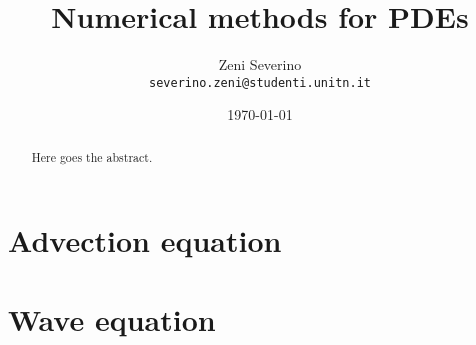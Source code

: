\documentclass[a4paper]{article}
\title{Numerical methods for PDEs}
\author{Zeni Severino\\
\texttt{severino.zeni@studenti.unitn.it}}
\date{\today}
\begin{document}
\maketitle

\begin{abstract}
  Here goes the abstract.
\end{abstract}

\section{Advection equation}

\section{Wave equation}
\end{document}
